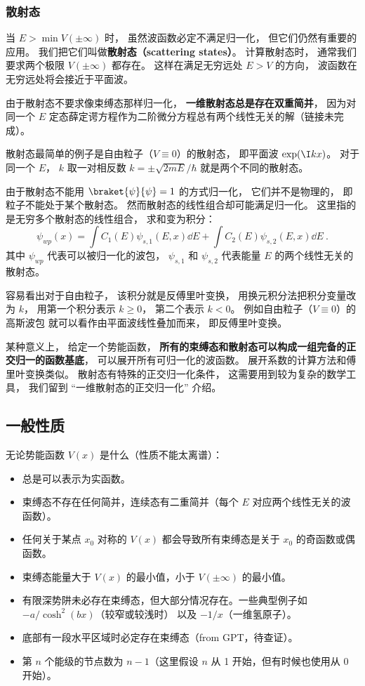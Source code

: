 \subsubsection{散射态}
当 $E > \min V(\pm\infty)$ 时， 虽然波函数必定不满足归一化， 但它们仍然有重要的应用。 我们把它们叫做\textbf{散射态（scattering states）}。 计算散射态时， 通常我们要求两个极限 $V(\pm \infty)$ 都存在。 这样在满足无穷远处 $E > V$ 的方向， 波函数在无穷远处将会接近于平面波。

由于散射态不要求像束缚态那样归一化， \textbf{一维散射态总是存在双重简并}， 因为对同一个 $E$ 定态薛定谔方程作为二阶微分方程总有两个线性无关的解（链接未完成）。

散射态最简单的例子是自由粒子（$V\equiv 0$）的散射态， 即平面波 $\exp(\I kx)$。 对于同一个 $E$， $k$ 取一对相反数 $k = \pm\sqrt{2mE}/\hbar$ 就是两个不同的散射态。

由于散射态不能用 $\braket{\psi}{\psi} = 1$ 的方式归一化， 它们并不是物理的， 即粒子不能处于某个散射态。 然而散射态的线性组合却可能满足归一化。 这里指的是无穷多个散射态的线性组合， 求和变为积分：
\begin{equation}
\psi_{wp}(x) = \int C_1(E) \psi_{s,1}(E, x)\dd{E} + \int C_2(E) \psi_{s,2}(E, x)\dd{E}~.
\end{equation}
其中 $\psi_{wp}$ 代表可以被归一化的波包， $\psi_{s,1}$ 和 $\psi_{s,2}$ 代表能量 $E$ 的两个线性无关的散射态。

容易看出对于自由粒子， 该积分就是反傅里叶变换， 用换元积分法把积分变量改为 $k$， 用第一个积分表示 $k\ge 0$， 第二个表示 $k<0$。 例如自由粒子（$V \equiv 0$）的高斯波包 就可以看作由平面波线性叠加而来， 即反傅里叶变换。

某种意义上， 给定一个势能函数， \textbf{所有的束缚态和散射态可以构成一组完备的正交归一的函数基底}， 可以展开所有可归一化的波函数。 展开系数的计算方法和傅里叶变换类似。 散射态有特殊的正交归一化条件， 这需要用到较为复杂的数学工具， 我们留到 “一维散射态的正交归一化” 介绍。

\subsection{一般性质}
无论势能函数 $V(x)$ 是什么（性质不能太离谱）：
\begin{itemize}
\item 总是可以表示为实函数。
\item 束缚态不存在任何简并，连续态有二重简并（每个 $E$ 对应两个线性无关的波函数）。
\item 任何关于某点 $x_0$ 对称的 $V(x)$ 都会导致所有束缚态是关于 $x_0$ 的奇函数或偶函数。
\item 束缚态能量大于 $V(x)$ 的最小值，小于 $V(\pm\infty)$ 的最小值。
\item 有限深势阱未必存在束缚态，但大部分情况存在。一些典型例子如 $-a/\cosh^2(bx)$（较窄或较浅时） 以及 $-1/x$（一维氢原子）。
\item 底部有一段水平区域时必定存在束缚态（from GPT，待查证）。
\item 第 $n$ 个能级的节点数为 $n-1$（这里假设 $n$ 从 1 开始，但有时候也使用从 0 开始）。
\end{itemize}

